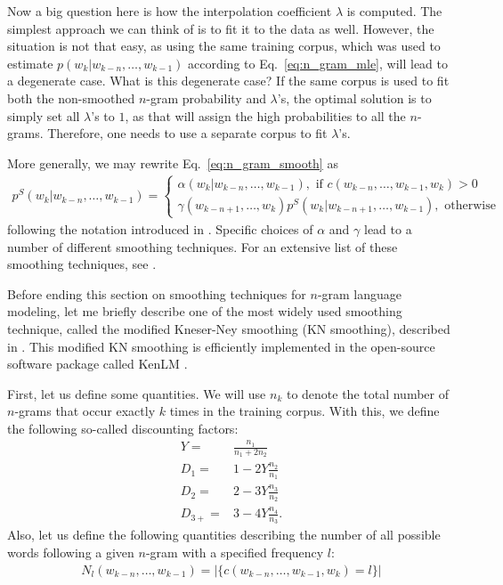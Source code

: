 \documentclass{report}
\begin{document}
Now a big question here is how the interpolation coefficient $\lambda$ is
computed. The simplest approach we can think of is to fit it to the data as
well. However, the situation is not that easy, as using the same training
corpus, which was used to estimate $p(w_k | w_{k-n}, \ldots, w_{k-1})$ according
to Eq.~\eqref{eq:n_gram_mle}, will lead to a degenerate case. What is this
degenerate case? If the same corpus is used to fit both the non-smoothed
$n$-gram probability and $\lambda$'s, the optimal solution is to simply set all
$\lambda$'s to $1$, as that will assign the high probabilities to all the
$n$-grams. Therefore, one needs to use a separate corpus to fit $\lambda$'s.

More generally, we may rewrite Eq.~\eqref{eq:n_gram_smooth} as
\begin{align}
    \label{eq:n_gram_smoothing_general}
    p^S(w_k | w_{k-n}, \ldots, w_{k-1}) = \left\{ 
        \begin{array}{l}
            \alpha(w_k | w_{k-n}, \ldots, w_{k-1}), \text{ if } c(w_{k-n},
            \ldots, w_{k-1}, w_k) > 0 \\
            \gamma(w_{k-n+1}, \ldots, w_{k}) p^S(w_{k}|w_{k-n+1}, \ldots,
            w_{k-1}), \text{ otherwise}
        \end{array}
        \right.
\end{align}
following the notation introduced in \citet{kneser1995improved}. Specific choices
of $\alpha$ and $\gamma$ lead to a number of different smoothing techniques. For
an extensive list of these smoothing techniques, see \citet{chen1996empirical}.

Before ending this section on smoothing techniques for $n$-gram language
modeling, let me briefly describe one of the most widely used smoothing
technique, called the modified Kneser-Ney smoothing (KN smoothing), described in
\citet{chen1996empirical}. This modified KN smoothing is efficiently implemented
in the open-source software package called KenLM \citep{Heafield-estimate}.

First, let us define some quantities. We will use $n_k$ to denote the total
number of $n$-grams that occur exactly $k$ times in the training corpus. With
this, we define the following so-called discounting factors:
\begin{align*}
    Y =& \frac{n_1}{n_1 + 2 n_2} \\
    D_1 =& 1 - 2 Y \frac{n_2}{n_1} \\
    D_2 =& 2 - 3 Y \frac{n_3}{n_2} \\
    D_{3+} =& 3 - 4 Y \frac{n_4}{n_3}.
\end{align*}
Also, let us define the following quantities describing the number of all
possible words following a given $n$-gram with a specified frequency $l$:
\begin{align*}
    N_l(w_{k-n}, \ldots, w_{k-1}) = |\{ c(w_{k-n}, \ldots, w_{k-1}, w_k) = l \}|
\end{align*}
\end{document}
